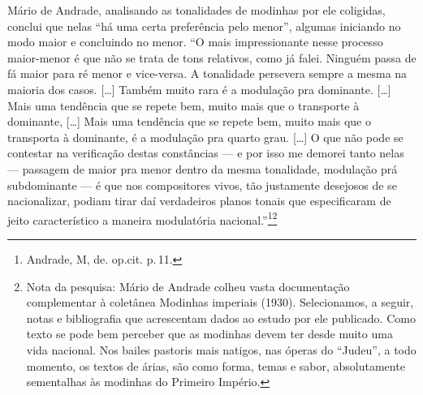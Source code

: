 Mário de Andrade, analisando as tonalidades de modinhas por ele
coligidas, conclui que nelas ``há uma certa preferência pelo menor'',
algumas iniciando no modo maior e concluindo no menor. ``O mais
impressionante nesse processo maior-menor é que não se trata de tons
relativos, como já falei. Ninguém passa de fá maior para ré menor e
vice-versa. A tonalidade persevera sempre a mesma na maioria dos casos.
{[}\ldots{}{]} Também muito rara é a modulação pra dominante. {[}\ldots{}{]} Mais uma
tendência que se repete bem, muito mais que o transporte à dominante,
{[}\ldots{}{]} Mais uma tendência que se repete bem, muito mais que o transporta
à dominante, é a modulação pra quarto grau. {[}\ldots{}{]} O que não pode se
contestar na verificação destas constâncias --- e por isso me demorei
tanto nelas --- passagem de maior pra menor dentro da mesma tonalidade,
modulação prá subdominante --- é que nos compositores vivos, tão
justamente desejosos de se nacionalizar, podiam tirar daí verdadeiros
planos tonais que especificaram de jeito característico a maneira
modulatória nacional.''\footnote{Andrade, M, de. op.cit. p.\,11.}\footnote{Nota da pesquisa: Mário de Andrade colheu vasta documentação
complementar à coletânea Modinhas imperiais (1930). Selecionamos, a
seguir, notas e bibliografia que acrescentam dados ao estudo por ele
publicado. Como texto se pode bem perceber que as modinhas devem ter desde muito
uma vida nacional. Nos bailes pastoris mais natigos, nas óperas do
``Judeu'', a todo momento, os textos de árias, são como forma, temas e
sabor, absolutamente sementalhas às modinhas do Primeiro Império.}

